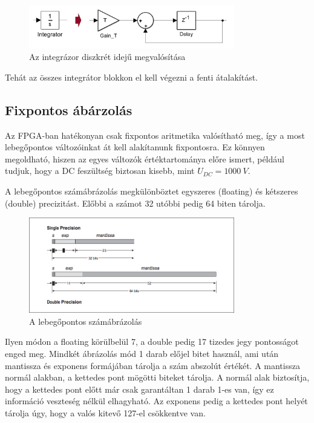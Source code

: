 \begin{figure}[h]
	\centering
	\includegraphics[width = 0.8\textwidth]{figures/integrator.png}
	\caption{Az integrázor diszkrét idejű megvalósítása} 
	\label{fig:integrator}
\end{figure}

Tehát az összes integrátor blokkon el kell végezni a fenti átalakítást.


\subsection{Fixpontos ábárzolás}

Az FPGA-ban hatékonyan csak fixpontos aritmetika valósítható meg, így a most lebegőpontos változóinkat át kell alakítanunk fixpontosra. Ez könnyen megoldható, hiszen az egyes változók értéktartománya előre ismert, például tudjuk, hogy a DC feszültség biztosan kisebb, mint $U_{DC}=1000\ V$.

A lebegőpontos számábrázolás megkülönböztet egyszeres (floating) és kétszeres (double) precizitást. Előbbi a számot 32 utóbbi pedig 64 biten tárolja.

\begin{figure}[H]
	\centering
	\includegraphics[width = 0.8\textwidth]{figures/floating.png}
	\caption{A lebegőpontos számábrázolás} 
	\label{fig:floating}
\end{figure}

Ilyen módon a floating körülbelül 7, a double pedig 17 tizedes jegy pontosságot enged meg. Mindkét ábrázolás mód 1 darab előjel bitet használ, ami után mantissza és exponens formájában tárolja a szám abszolút értékét. A mantissza normál alakban, a kettedes pont mögötti biteket tárolja. A normál alak biztosítja, hogy a kettedes pont előtt már csak garantáltan 1 darab 1-es van, így ez információ veszteség nélkül elhagyható. Az exponens pedig a kettedes pont helyét tárolja úgy, hogy a valós kitevő 127-el csökkentve van.

